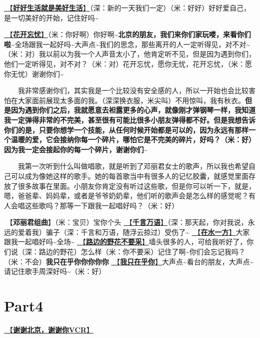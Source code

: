 \documentclass[]{ctexbook}
\begin{document}
\hyperref[live-happy-life-happy]{🎵【\textbf{好好生活就是美好生活}】}（深：新的一天我们一定）（米：好好）好好爱自己，是一切美好的开始，记住好吗\textasciitilde{}

\hyperref[no-worries]{🎵【\textbf{花开忘忧}】}（米：你好啊）你好啊\textasciitilde{}\textbf{北京的朋友，我们来你们家玩喽，来看你们啦\textasciitilde{}}全场跟我一起好吗\textasciitilde 大声点\textasciitilde 我们的思念，那些离开的人一定听得见，对不对\textasciitilde（米：对）我以前以为我一个人声音太小了，他肯定听不见，但是因为遇到你们，他们一定听得见，对不对？（米：对）花开忘忧，愿你无忧，花开忘忧，（米：愿你无忧）谢谢你们\textasciitilde{}

  我非常感谢你们，其实我是一个比较没有安全感的人，所以一开始也会比较害怕在大家面前展现太多面的我。（深深换衣服，米尖叫）不用惊叫，我有秋衣。\textbf{但是因为遇到你们之后，我就愿意去袒露更多的心声，就像刚才弹钢琴一样，我知道我一定弹得非常的不完美，甚至很有可能比很多小朋友弹得都不好。但是我想告诉你们的是，只要你想学一个技能，从任何时候开始都是可以的，因为永远有那样一个温暖的爱，它会接纳你每一个碎片，哪怕它是不完美的碎片，好吗？（米：好）因为我一定会接起你的每一个碎片，谢谢你们\textasciitilde{}}

  我第一次听到什么叫做唱歌，就是听到了邓丽君女士的歌声，所以我也希望自己可以成为像她这样的歌手。她的每首歌当中有很多人的记忆胶囊，就感觉里面存放了很多故事在里面。小朋友你肯定没有听过这些歌，但是你可以听一下，就是，嗯，爸爸辈、妈妈辈，或者是爷爷奶奶辈，他们听的歌声会是怎么样的感觉呢？有人会唱这些歌吗？那等一下跟我一起唱好吗？（米：好）

🎵【\textbf{邓丽君组曲}】（米：宝贝）宝你个头
\hyperref[thousands-of-words]{🎵【\textbf{千言万语}】}（深：那天起，你对我说，永远的爱着我）骗子（深：千言和万语，随浮云掠过）受伤了\textasciitilde{}
\hyperref[on-the-water-side]{🎵【\textbf{在水一方}】}大家跟我一起唱好吗\textasciitilde 全场\textasciitilde{}
\hyperref[only-with-me]{🎵【\textbf{路边的野花不要采}】}墙头很多的人，可给我听好了，你们说（深：路边的野花）怎么样（米：你不要采）记住了啊\textasciitilde 你们会忘记我吗？（米：不会）\textbf{我只在乎你你你你你}
\hyperref[only-you]{🎵【\textbf{我只在乎你}】}大声点\textasciitilde 看台的朋友，大声点\textasciitilde 请记住歌手周深好吗\textasciitilde（米：好）

\section{Part4}\label{beijing-20240922-part4}

\hyperref[thank-you-vcr]{🎥【\textbf{谢谢北京，谢谢你VCR}】}
\end{document}
